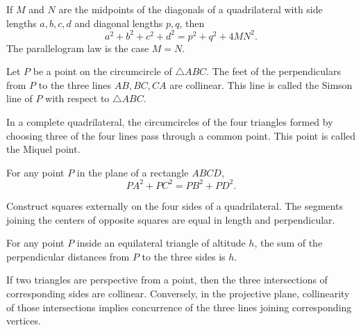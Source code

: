     \begin{theorem}
        If $M$ and $N$ are the midpoints of the diagonals of a quadrilateral with
        side lengths $a,b,c,d$ and diagonal lengths $p,q$, then
        \[
            a^2+b^2+c^2+d^2=p^2+q^2+4MN^2.
        \]
        The parallelogram law is the case $M=N$.
    \end{theorem}

    \begin{theorem}
        Let $P$ be a point on the circumcircle of $\triangle ABC$. The feet of
        the perpendiculars from $P$ to the three lines $AB,BC,CA$ are collinear.
        This line is called the Simson line of $P$ with respect to
        $\triangle ABC$.
    \end{theorem}

    \begin{theorem}
        In a complete quadrilateral, the circumcircles of the four triangles
        formed by choosing three of the four lines pass through a common point.
        This point is called the Miquel point.
    \end{theorem}




    \begin{theorem}
        For any point $P$ in the plane of a rectangle $ABCD$,
        \[
            PA^2+PC^2=PB^2+PD^2.
        \]
    \end{theorem}

    \begin{theorem}
        Construct squares externally on the four sides of a quadrilateral. The
        segments joining the centers of opposite squares are equal in length
        and perpendicular.
    \end{theorem}

    \begin{theorem}
        For any point $P$ inside an equilateral triangle of altitude $h$, the sum
        of the perpendicular distances from $P$ to the three sides is $h$.
    \end{theorem}

    \begin{theorem}
        If two triangles are perspective from a point, then the three
        intersections of corresponding sides are collinear. Conversely, in the
        projective plane, collinearity of those intersections implies concurrence
        of the three lines joining corresponding vertices.
    \end{theorem}

